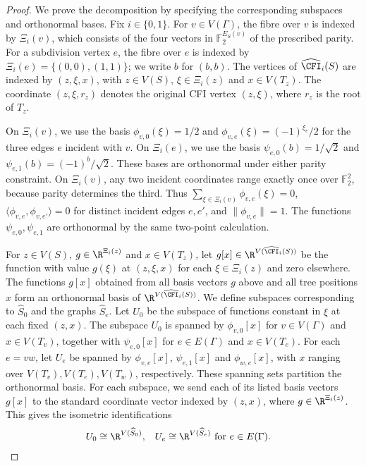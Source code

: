\begin{proof}
We prove the decomposition by specifying the corresponding subspaces
and orthonormal bases.
Fix $i\in\{0,1\}$.
For $v\in V(\Gamma)$, the fibre over $v$ is indexed by $\Xi_i(v)$, which
consists of the four vectors in $\mathbb F_2^{E_S(v)}$ of the
prescribed parity.
For a subdivision vertex $e$, the fibre over $e$ is indexed by
$\Xi_i(e)=\{(0,0),(1,1)\}$; we write $b$ for $(b,b)$.
The vertices of $\widehat{\CFI}_i(S)$ are indexed by $(z,\xi,x)$, with $z\in V(S)$,
$\xi\in \Xi_i(z)$ and $x\in V(T_z)$.
The coordinate $(z,\xi,r_z)$ denotes the original CFI vertex $(z,\xi)$,
where $r_z$ is the root of $T_z$.

On $\Xi_i(v)$, we use the basis $\phi_{v,0}(\xi)=1/2$ and
$\phi_{v,e}(\xi)=(-1)^{\xi_e}/2$ for the three edges $e$ incident with $v$.
On $\Xi_i(e)$, we use the basis $\psi_{e,0}(b)=1/\sqrt2$ and
$\psi_{e,1}(b)=(-1)^b/\sqrt2$.
These bases are orthonormal under either parity constraint.
On $\Xi_i(v)$, any two incident coordinates range exactly once over
$\mathbb F_2^2$, because parity determines the third.
Thus $\sum_{\xi\in \Xi_i(v)}\phi_{v,e}(\xi)=0$,
$\langle\phi_{v,e},\phi_{v,e'}\rangle=0$ for distinct incident edges $e,e'$,
and $\lVert\phi_{v,e}\rVert=1$.
The functions $\psi_{e,0},\psi_{e,1}$ are orthonormal by the same two-point
calculation.

For $z\in V(S)$, $g\in\R^{\Xi_i(z)}$ and $x\in V(T_z)$,
let $g[x]\in\R^{V(\widehat{\CFI}_i(S))}$ be the function with value $g(\xi)$ at
$(z,\xi,x)$ for each $\xi\in \Xi_i(z)$ and zero elsewhere.
The functions $g[x]$ obtained from all basis vectors $g$ above and all
tree positions $x$ form an orthonormal basis of $\R^{V(\widehat{\CFI}_i(S))}$.
We define subspaces corresponding to $\widehat S_0$
and the graphs $\widehat S_e$.
Let $U_0$ be the subspace of functions constant in $\xi$ at each fixed $(z,x)$.
The subspace $U_0$ is spanned by $\phi_{v,0}[x]$ for $v\in V(\Gamma)$
and $x\in V(T_v)$, together with $\psi_{e,0}[x]$ for $e\in E(\Gamma)$
and $x\in V(T_e)$.
For each $e=vw$, let $U_e$ be spanned by $\phi_{v,e}[x]$, $\psi_{e,1}[x]$
and $\phi_{w,e}[x]$, with $x$ ranging over $V(T_v),V(T_e),V(T_w)$,
respectively.
These spanning sets partition the orthonormal basis.
For each subspace, we send each of its listed basis vectors $g[x]$ to the standard coordinate vector indexed
by $(z,x)$, where $g\in\R^{\Xi_i(z)}$.
This gives the isometric identifications
\begin{equation}\label{eq:ss-cfi-subspaces}
 \begin{aligned}
 U_0&\cong\R^{V(\widehat S_0)}, &
 U_e&\cong\R^{V(\widehat S_e)}\text{ for }e\in E(\Gamma).
 \end{aligned}
\end{equation}


\end{proof}
